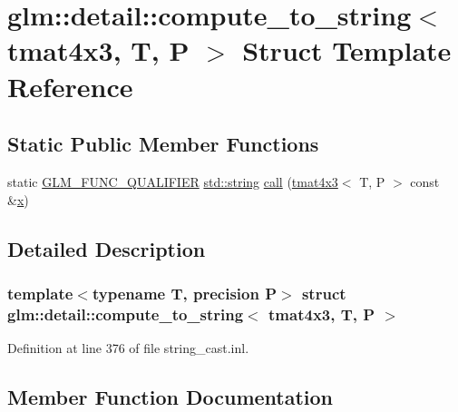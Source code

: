 \hypertarget{structglm_1_1detail_1_1compute__to__string_3_01tmat4x3_00_01_t_00_01_p_01_4}{}\section{glm\+::detail\+::compute\+\_\+to\+\_\+string$<$ tmat4x3, T, P $>$ Struct Template Reference}
\label{structglm_1_1detail_1_1compute__to__string_3_01tmat4x3_00_01_t_00_01_p_01_4}
\subsection*{Static Public Member Functions}
\begin{DoxyCompactItemize}
\item 
static \mbox{\hyperlink{setup_8hpp_a33fdea6f91c5f834105f7415e2a64407}{G\+L\+M\+\_\+\+F\+U\+N\+C\+\_\+\+Q\+U\+A\+L\+I\+F\+I\+ER}} \mbox{\hyperlink{glad_8h_ac83513893df92266f79a515488701770}{std\+::string}} \mbox{\hyperlink{structglm_1_1detail_1_1compute__to__string_3_01tmat4x3_00_01_t_00_01_p_01_4_a03c7f8dad22b2fbd9a5f90593cffc1a1}{call}} (\mbox{\hyperlink{structglm_1_1tmat4x3}{tmat4x3}}$<$ T, P $>$ const \&\mbox{\hyperlink{glad_8h_a92d0386e5c19fb81ea88c9f99644ab1d}{x}})
\end{DoxyCompactItemize}


\subsection{Detailed Description}
\subsubsection*{template$<$typename T, precision P$>$\newline
struct glm\+::detail\+::compute\+\_\+to\+\_\+string$<$ tmat4x3, T, P $>$}



Definition at line 376 of file string\+\_\+cast.\+inl.



\subsection{Member Function Documentation}
\mbox{\label{structglm_1_1detail_1_1compute__to__string_3_01tmat4x3_00_01_t_00_01_p_01_4_a03c7f8dad22b2fbd9a5f90593cffc1a1}} 
